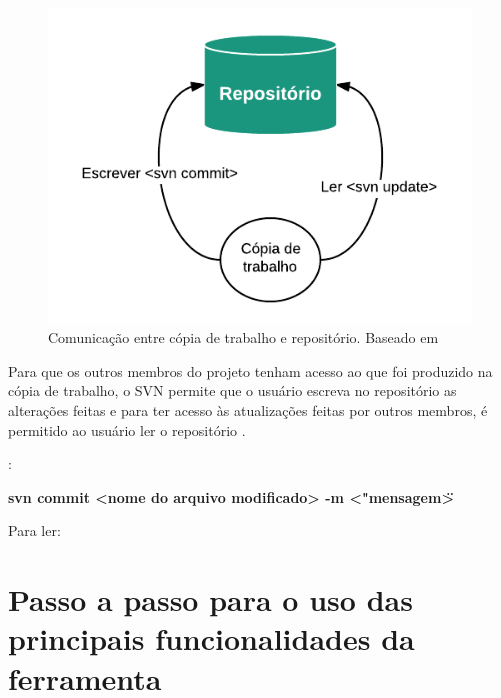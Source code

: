\begin{figure}[!htb]
\centering
\includegraphics[scale=1]{figuras/repositorio_copia.png}
\caption{Comunicação entre cópia de trabalho e repositório. Baseado em \cite{svn-book}}
\end{figure}


Para que os outros membros do projeto tenham acesso ao que foi produzido na cópia de trabalho, o SVN permite que o usuário escreva no repositório as alterações feitas
e para ter acesso às atualizações feitas por outros membros, é permitido ao usuário ler o repositório \cite{svn-book}.

\begin{multicols}{2} 


:{

\colorbox{PineGreen}{
\begin{minipage}{210px}
  \textbf{svn commit <nome do arquivo modificado> -m <"mensagem\">}
\end{minipage}
}
}

Para ler:

\colorbox{PineGreen}{
\begin{minipage}{200px}
\end{minipage}
}

\end{multicols}

\section{Passo a passo para o uso das principais funcionalidades da ferramenta}

